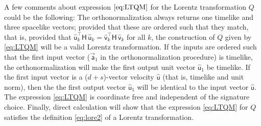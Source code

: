 \documentclass{article}
\newcommand{\metric}{\mathsf{H}}
\newcommand\upvec[1]{\!\vec{\,\mathrm{#1}}}
\newcommand{\Lvec}[1]{\upvec{\mathsf{#1}}} %
\newcommand{\Lhat}[1]{\hat{\mathsf{#1}}} %
\newcommand{\plus}{\!+\!} %
\begin{document}
A few comments about expression $\eqref{eq:LTQM}$ for the Lorentz transformation $Q$ could be the following:
The orthonormalization always returns one timelike and three spacelike vectors;
provided that these are ordered such that they match, that is, provided that $\Lhat{u}_k^\top\metric\,\Lhat{u}_k=\Lhat{v}_k^\top\metric\,\Lhat{v}_k$ for all $k$, the construction of $Q$ given by \eqref{eq:LTQM} will be a valid Lorentz transformation.
If the inputs are ordered such that the first input vector ($\Lvec{a}_1$ in the orthonormalization procedure) is timelike, the orthonormalization will make the first output unit vector $\Lhat{u}_1$ be timelike.
If the first input vector is a ($d\plus s$)-vector velocity $\Lhat{u}$ (that is, timelike and unit norm), then the the first output vector $\Lhat{u}_1$ will be identical to the input vector $\Lhat{u}$.
The expression \eqref{eq:LTQM} is coordinate free and independent of the signature choice.
Finally, direct calculation will show that the expression \eqref{eq:LTQM} for $Q$ satisfies the definition \eqref{eq:lore2} of a Lorentz transformation.
\end{document}
